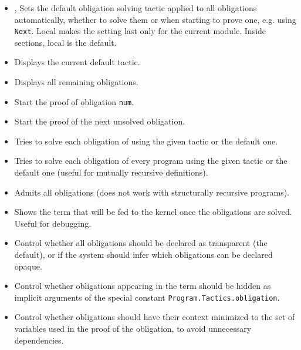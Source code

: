 \begin{itemize}
\item {, }
  Sets the default obligation
  solving tactic applied to all obligations automatically, whether to
  solve them or when starting to prove one, e.g. using {\tt Next}.
  Local makes the setting last only for the current module. Inside
  sections, local is the default.
\item {}
  Displays the current default tactic.
\item {} Displays all remaining
  obligations.
\item {} Start the proof of
  obligation {\tt num}.
\item {} Start the proof of the next
  unsolved obligation.
\item {}
  Tries to solve
  each obligation of \ident using the given tactic or the default one.
\item {} Tries to solve
  each obligation of every program using the given tactic or the default
  one (useful for mutually recursive definitions).
\item {}
  Admits all obligations (does not work with structurally recursive programs).
\item {}
  Shows the term that will be fed to
  the kernel once the obligations are solved. Useful for debugging.
\item {}
  Control whether all obligations should be declared as transparent (the
  default), or if the system should infer which obligations can be declared opaque. 
\item {}
  Control whether obligations appearing in the term should be hidden
  as implicit arguments of the special constant
  \texttt{Program.Tactics.obligation}.
\item {}
  Control whether obligations should have their
  context minimized to the set of variables used in the proof of the
  obligation, to avoid unnecessary dependencies.
\end{itemize}

